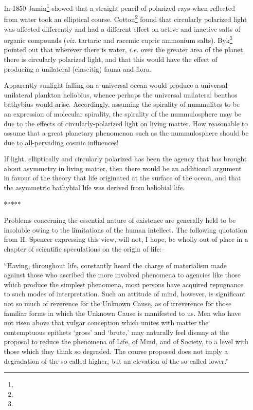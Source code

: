 \documentclass[a4paper, 12pt, oneside]{article}
\begin{document}
In 1850 Jamin\footnote{} showed that a straight pencil of polarized rays when reflected from water took an elliptical course. Cotton\footnote{} found that circularly polarized light was affected differently and had a different effect on active and inactive salts of organic compounds (\emph{viz.} tartaric and racemic cupric ammonium salts). Byk\footnote{} pointed out that wherever there is water, \emph{i.e.} over the greater area of the planet, there is circularly polarized light, and that this would have the effect of producing a unilateral (einseitig) fauna and flora.

Apparently sunlight falling on a universal ocean would produce a universal unilateral plankton heliobius, whence perhaps the universal unilateral benthos bathybius would arise. Accordingly, assuming the spirality of nummulites to be an expression of molecular spirality, the spirality of the nummulosphere may be due to the effects of circularly-polarized light on living matter. How reasonable to assume that a great planetary phenomenon such as the nummulosphere should be due to all-pervading cosmic influences!

If light, elliptically and circularly polarized has been the agency that has brought about asymmetry in living matter, then there would be an additional argument in favour of the theory that life originated at the surface of the ocean, and that the asymmetric bathybial life was derived from heliobial life.

\centerline{*\hspace{15mm}*\hspace{15mm}*\hspace{15mm}*\hspace{15mm}*}
\bigskip

Problems concerning the essential nature of existence are generally held to be insoluble owing to the limitations of the human intellect. The following quotation from H. Spencer expressing this view, will not, I hope, be wholly out of place in a chapter of scientific speculations on the origin of life:--

``Having, throughout life, constantly heard the charge of materialism made against those who ascribed the more involved phenomena to agencies like those which produce the simplest phenomena, most persons have acquired repugnance to such modes of interpretation. Such an attitude of mind, however, is significant not so much of reverence for the Unknown Cause, as of irreverence for those familiar forms in which the Unknown Cause is manifested to us. Men who have not risen above that vulgar conception which unites with matter the contemptuous epithets `gross' and `brute,' may naturally feel dismay at the proposal to reduce the phenomena of Life, of Mind, and of Society, to a level with those which they think so degraded. The course proposed does not imply a degradation of the so-called higher, but an elevation of the so-called lower.''
\end{document}
